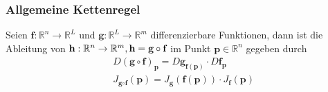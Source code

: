 \documentclass[8pt, a4paper, landscape, fleqn]{scrartcl}
\begin{document}
\begin{multicols*}{3}
				\subsubsection{Allgemeine Kettenregel}
					Seien $\textbf{f}:\mathbb{R}^n \rightarrow \mathbb{R}^L$ und $\textbf{g}:\mathbb{R}^L \rightarrow \mathbb{R}^m$ differenzierbare Funktionen, dann ist die Ableitung von $\textbf{h}:\mathbb{R}^n \rightarrow \mathbb{R}^m, \* \textbf{h}=\textbf{g} \circ \textbf{f}$ im Punkt $\textbf{p} \in \mathbb{R}^n$ gegeben durch
					\begin{align*}
						&D(\textbf{g}\circ \textbf{f})_{\textbf{p}} =D\textbf{g}_{\textbf{f}(\textbf{p})}\cdot D\textbf{f}_{\textbf{p}}\\
						&J_{\textbf{g}\circ \textbf{f}}(\textbf{p}) =J_{\textbf{g}}(\textbf{f}(\textbf{p}))\cdot J_{\textbf{f}}(\textbf{p})
					\end{align*}

\end{multicols*}
\end{document}
